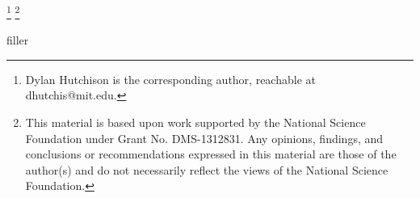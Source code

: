 \documentclass[conference]{IEEEtran}
\begin{document}
{\let\thefootnote\relax\footnote{\hspace{-\parindent}Dylan Hutchison is the corresponding
    author, reachable at dhutchis@mit.edu.
}}
{\let\thefootnote\relax\footnote{This material is based upon work
    supported by the National Science Foundation under Grant
    No. DMS-1312831. Any opinions, findings, and conclusions or recommendations expressed in this material are those of the author(s) and do not necessarily reflect the views of the National Science Foundation.
}}

\setcounter{footnote}{0}

\newcommand{\numparties}{\ensuremath{\mathcal{P}}}



\IEEEpeerreviewmaketitle

filler\cite{kepner2014achieving}









%
%
\end{document}
